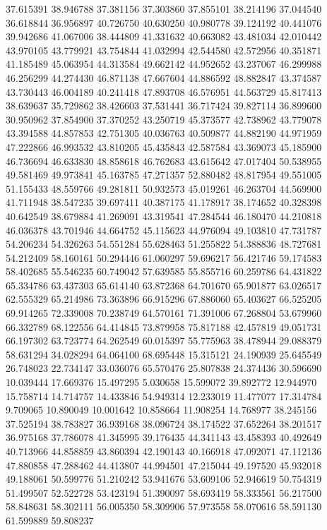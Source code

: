 37.615391
38.946788
37.381156
37.303860
37.855101
38.214196
37.044540
36.618844
36.956897
40.726750
40.630250
40.980778
39.124192
40.441076
39.942686
41.067006
38.444809
41.331632
40.663082
43.481034
42.010442
43.970105
43.779921
43.754844
41.032994
42.544580
42.572956
40.351871
41.185489
45.063954
44.313584
49.662142
44.952652
43.237067
46.299988
46.256299
44.274430
46.871138
47.667604
44.886592
48.882847
43.374587
43.730443
46.004189
40.241418
47.893708
46.576951
44.563729
45.817413
38.639637
35.729862
38.426603
37.531441
36.717424
39.827114
36.899600
30.950962
37.854900
37.370252
43.250719
45.373577
42.738962
43.779078
43.394588
44.857853
42.751305
40.036763
40.509877
44.882190
44.971959
47.222866
46.993532
43.810205
45.435843
42.587584
43.369073
45.185900
46.736694
46.633830
48.858618
46.762683
43.615642
47.017404
50.538955
49.581469
49.973841
45.163785
47.271357
52.880482
48.817954
49.551005
51.155433
48.559766
49.281811
50.932573
45.019261
46.263704
44.569900
41.711948
38.547235
39.697411
40.387175
41.178917
38.174652
40.328398
40.642549
38.679884
41.269091
43.319541
47.284544
46.180470
44.210818
46.036378
43.701946
44.664752
45.115623
44.976094
49.103810
47.731787
54.206234
54.326263
54.551284
55.628463
51.255822
54.388836
48.727681
54.212409
58.160161
50.294446
61.060297
59.696217
56.421746
59.174583
58.402685
55.546235
60.749042
57.639585
55.855716
60.259786
64.431822
65.334786
63.437303
65.614140
63.872368
64.701670
65.901877
63.026517
62.555329
65.214986
73.363896
66.915296
67.886060
65.403627
66.525205
69.914265
72.339008
70.238749
64.570161
71.391006
67.268804
53.679960
66.332789
68.122556
64.414845
73.879958
75.817188
42.457819
49.051731
66.197302
63.723774
64.262549
60.015397
55.775963
38.478944
29.088379
58.631294
34.028294
64.064100
68.695448
15.315121
24.190939
25.645549
26.748023
22.734147
33.036076
65.570476
25.807838
24.374436
30.596690
10.039444
17.669376
15.497295
5.030658
15.599072
39.892772
12.944970
15.758714
14.714757
14.433846
54.949314
12.233019
11.477077
17.314784
9.709065
10.890049
10.001642
10.858664
11.908254
14.768977
38.245156
37.525194
38.783827
36.939168
38.096724
38.174522
37.652264
38.201517
36.975168
37.786078
41.345995
39.176435
44.341143
43.458393
40.492649
40.713966
44.858859
43.860394
42.190143
40.166918
47.092071
47.112136
47.880858
47.288462
44.413807
44.994501
47.215044
49.197520
45.932018
49.188061
50.599776
51.210242
53.941676
53.609106
52.946619
50.754319
51.499507
52.522728
53.423194
51.390097
58.693419
58.333561
56.217500
58.848631
58.302111
56.005350
58.309906
57.973558
58.070616
58.591130
61.599889
59.808237
